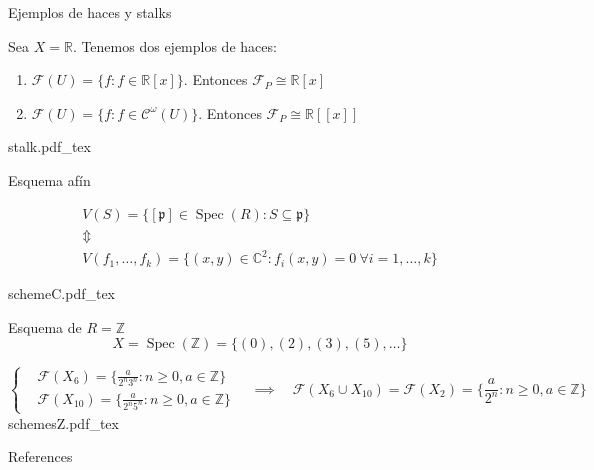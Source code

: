 \documentclass[10pt]{beamer}
\DeclareMathOperator{\Spec}{Spec}
\newcommand{\incfig}[1]{%
\center
\def\svgwidth{0.9\columnwidth}
{#1.pdf_tex}
}
\begin{document}
\begin{frame}[fragile]{Ejemplos de haces y stalks}

  Sea $X = \mathbb{R}$. Tenemos dos ejemplos de haces:
\begin{enumerate}
  \item $\mathcal{F}(U) = \{f: f\in \mathbb{R}[x]\}$. Entonces $\mathcal{F}_P \cong \mathbb{R}[x]$ 
  \item $\mathcal{F}(U) = \{f: f\in \mathcal{C}^{\omega}(U) \}$. Entonces $\mathcal{F}_P \cong \mathbb{R}[[x]]$ 
\end{enumerate}

\incfig{stalk}

\end{frame}


\begin{frame}[fragile]{Esquema afín}

\begin{gather*}
V(S) = \{[\mathfrak{p} ] \in \Spec(R) : S \subseteq \mathfrak{p}  \}\\
\Updownarrow\\
V(f_1, \dots, f_k) = \{(x,y) \in \mathbb{C}^2: f_i(x,y) = 0 \ \forall  i = 1,\dots,k \}
\end{gather*}

\incfig{schemeC}

\end{frame}


\begin{frame}[fragile]{Esquema de $R = \mathbb{Z}$}
\[
X = \Spec(\mathbb{Z}) = \{(0),(2), (3), (5), \ldots\}
\]

\[
    \begin{cases}
&\mathcal{F}(X_6)  = \{ \frac{a}{2^n3^n} : n \ge 0, a \in \mathbb{Z}\}\\
&\mathcal{F}(X_{10})  = \{ \frac{a}{2^n5^n} : n \ge 0, a \in \mathbb{Z}\} 
    \end{cases} \quad  \implies \quad  \mathcal{F}(X_6 \cup X_{10}) = \mathcal{F}(X_2)  = \{ \frac{a}{2^n} : n \ge 0, a \in \mathbb{Z}\}
\]
\incfig{schemesZ}
\end{frame}








\begin{frame}[allowframebreaks]{References}

\nocite{*}



\end{frame}
\end{document}
